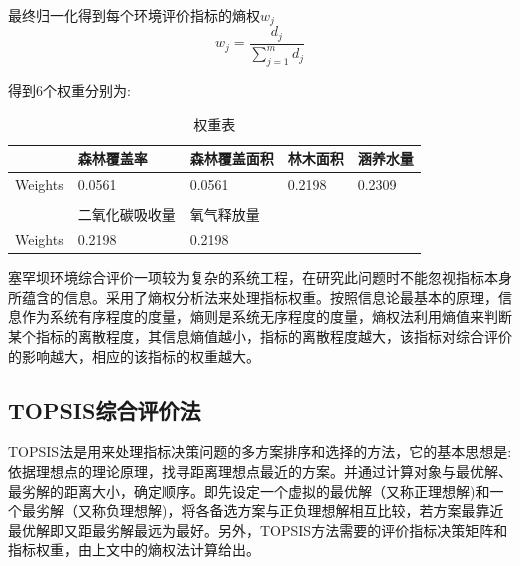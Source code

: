 \documentclass[UTF8]{ctexart}
\begin{document}
最终归一化得到每个环境评价指标的熵权$w_j$
\begin{equation}
    w_j=\frac{d_j}{\sum_{j=1}^{m}d_j}
\end{equation}

得到6个权重分别为:

\begin{table}[H]
    \begin{tabular}{lllll}
        \hline
        \multicolumn{1}{|l|}{}        & \multicolumn{1}{l|}{森林覆盖率}   & \multicolumn{1}{l|}{森林覆盖面积} & \multicolumn{1}{l|}{林木面积}   & \multicolumn{1}{l|}{涵养水量}   \\ \hline
        \multicolumn{1}{|l|}{Weights} & \multicolumn{1}{l|}{0.0561}  & \multicolumn{1}{l|}{0.0561} & \multicolumn{1}{l|}{0.2198} & \multicolumn{1}{l|}{0.2309} \\ \hline
                                      &                              &                             &                             &                             \\ \cline{1-3}
        \multicolumn{1}{|l|}{}        & \multicolumn{1}{l|}{二氧化碳吸收量} & \multicolumn{1}{l|}{氧气释放量}  &                             &                             \\ \cline{1-3}
        \multicolumn{1}{|l|}{Weights} & \multicolumn{1}{l|}{0.2198}  & \multicolumn{1}{l|}{0.2198} &                             &                             \\ \cline{1-3}
        \end{tabular}
    \caption{权重表}
\end{table}



塞罕坝环境综合评价一项较为复杂的系统工程，在研究此问题时不能忽视指标本身所蕴含的信息。采用了熵权分析法来处理指标权重。按照信息论最基本的原理，信息作为系统有序程度的度量，熵则是系统无序程度的度量，熵权法利用熵值来判断某个指标的离散程度，其信息熵值越小，指标的离散程度越大，该指标对综合评价的影响越大，相应的该指标的权重越大。 
\subsection{TOPSIS综合评价法}
TOPSIS法是用来处理指标决策问题的多方案排序和选择的方法，它的基本思想是:依据理想点的理论原理，找寻距离理想点最近的方案。并通过计算对象与最优解、最劣解的距离大小，确定顺序。即先设定一个虚拟的最优解（又称正理想解)和一个最劣解（又称负理想解)，将各备选方案与正负理想解相互比较，若方案最靠近最优解即又距最劣解最远为最好。另外，TOPSIS方法需要的评价指标决策矩阵和指标权重，由上文中的熵权法计算给出。
\end{document}
